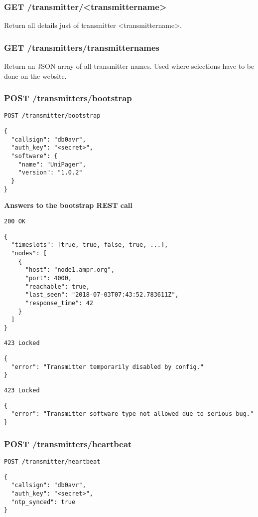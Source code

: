 \subsubsection{GET /transmitter/<transmittername>}
Return all details just of transmitter <transmittername>.

\subsubsection{GET /transmitters/transmitternames}
Return an JSON array of all transmitter names. Used where selections have to be done on the website.

\subsubsection{POST /transmitters/bootstrap}
\label{protcoldef:transmitters:bootstrap}
\texttt{POST /transmitter/bootstrap}
\begin{lstlisting}
{
  "callsign": "db0avr",
  "auth_key": "<secret>",
  "software": {
    "name": "UniPager",
    "version": "1.0.2"
  }
}
\end{lstlisting}

\textbf{Answers to the bootstrap REST call}

\texttt{200 OK}
\begin{lstlisting}
{
  "timeslots": [true, true, false, true, ...],
  "nodes": [
    {
      "host": "node1.ampr.org",
      "port": 4000,
      "reachable": true,
      "last_seen": "2018-07-03T07:43:52.783611Z",
      "response_time": 42
    }
  ]
}
\end{lstlisting}

\texttt{423 Locked}
\begin{lstlisting}
{
  "error": "Transmitter temporarily disabled by config."
}
\end{lstlisting}

\texttt{423 Locked}
\begin{lstlisting}
{
  "error": "Transmitter software type not allowed due to serious bug."
}
\end{lstlisting}


\subsubsection{POST /transmitters/heartbeat}
\texttt{POST /transmitter/heartbeat}
\begin{lstlisting}
{
  "callsign": "db0avr",
  "auth_key": "<secret>",
  "ntp_synced": true
}
\end{lstlisting}

